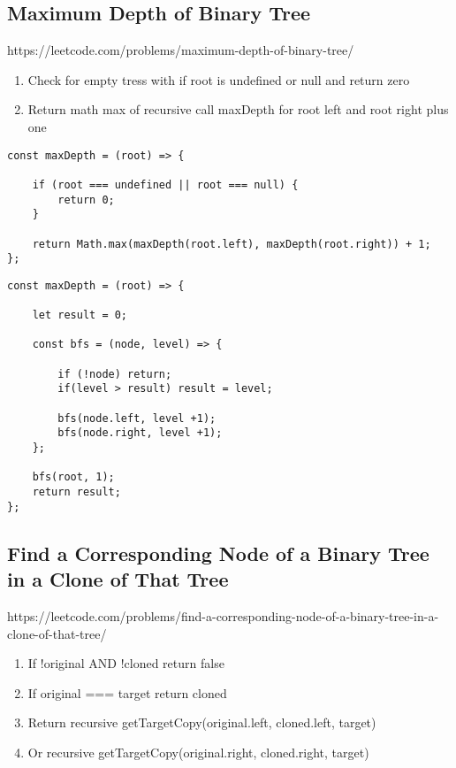 \documentclass[10pt]{article}
\begin{document}
\medskip   
\subsection{Maximum Depth of Binary Tree}
https://leetcode.com/problems/maximum-depth-of-binary-tree/

\begin{enumerate}
	\item Check for empty tress with if root is undefined or null and return zero
	\item Return math max of recursive call maxDepth for root left and root right plus one

\end{enumerate}

\begin{lstlisting}[title=Solution maxDepth, captionpos=t]
const maxDepth = (root) => {
    
    if (root === undefined || root === null) {
        return 0;
    }
    
    return Math.max(maxDepth(root.left), maxDepth(root.right)) + 1;
};
\end{lstlisting}

\begin{lstlisting}[title=Solution maxDepth bfs, captionpos=t]
const maxDepth = (root) => {
    
    let result = 0;
    
    const bfs = (node, level) => {
        
        if (!node) return;
        if(level > result) result = level; 
        
        bfs(node.left, level +1);
        bfs(node.right, level +1);
    };
    
    bfs(root, 1);
    return result;
};
\end{lstlisting}

\medskip %




\pagebreak
\medskip   
\subsection{Find a Corresponding Node of a Binary Tree in a Clone of That Tree}
https://leetcode.com/problems/find-a-corresponding-node-of-a-binary-tree-in-a-clone-of-that-tree/

\begin{enumerate}
	\item If !original AND !cloned return false
	\item If original === target return cloned 
	\item Return recursive getTargetCopy(original.left, cloned.left, target)
	\item Or recursive getTargetCopy(original.right, cloned.right, target)
\end{enumerate}
\end{document}
